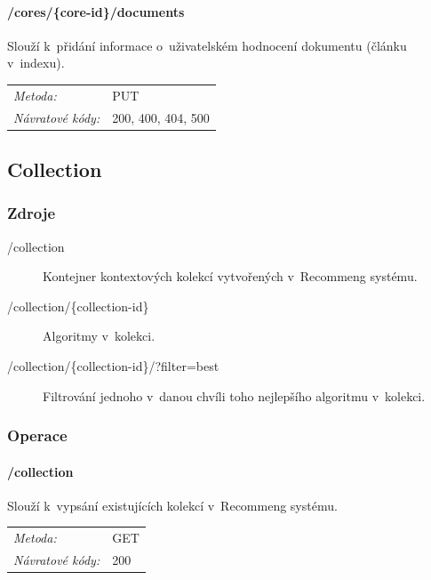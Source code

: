 \documentclass[thesis=M,czech]{FITthesis}[2014/05/07]
\begin{document}
\paragraph*{/cores/\{core-id\}/documents}

Slouží k~přidání informace o~uživatelském hodnocení dokumentu (článku v~indexu).

\begin{center}
 	\begin{tabular}{lp{10cm}}
 		\textit{Metoda:}		& PUT			\tabularnewline 
 		\textit{Návratové kódy:}		& 200, 400, 404, 500		\tabularnewline 		
 	\end{tabular}
\end{center} 

\subsection{Collection}

\subsubsection{Zdroje}

\begin{description}
	\item[/collection] Kontejner kontextových kolekcí vytvořených v~Recommeng systému.
	\item[/collection/\{collection-id\}] Algoritmy v~kolekci.
	\item[/collection/\{collection-id\}/?filter=best] Filtrování jednoho v~danou chvíli toho nejlepšího algoritmu v~kolekci.
\end{description}

\subsubsection{Operace}

\paragraph*{/collection}

Slouží k~vypsání existujících kolekcí v~Recommeng systému.

\begin{center}
 	\begin{tabular}{lp{10cm}}
 		\textit{Metoda:}		& GET			\tabularnewline 
 		\textit{Návratové kódy:}		& 200			\tabularnewline 		
 	\end{tabular}	
\end{center} 
\end{document}
